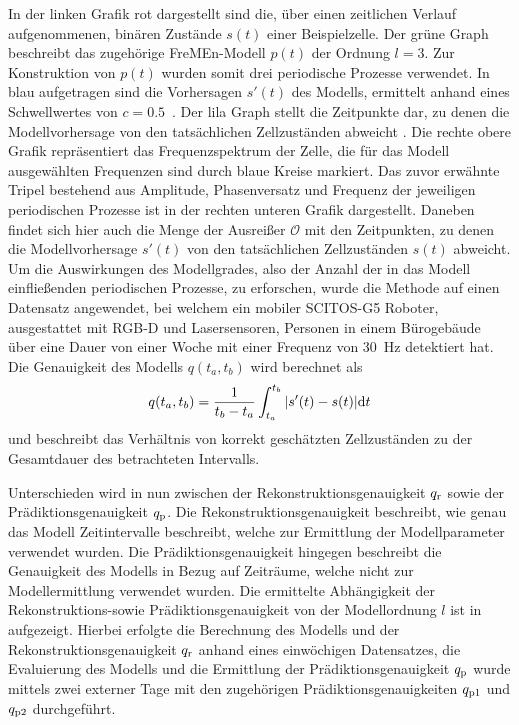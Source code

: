 In der linken Grafik rot dargestellt sind die, über einen zeitlichen Verlauf aufgenommenen, binären Zustände $s(t)$ einer Beispielzelle. Der grüne Graph beschreibt das zugehörige FreMEn-Modell $p(t)$ der Ordnung $l = 3$. Zur Konstruktion von $p(t)$ wurden somit drei periodische Prozesse verwendet. In blau aufgetragen sind die Vorhersagen $s'(t)$ des Modells, ermittelt anhand eines Schwellwertes von $c = 0.5$ \,. Der lila Graph stellt die Zeitpunkte dar, zu denen die Modellvorhersage von den tatsächlichen Zellzuständen abweicht \cite{Krajnik.2014}. Die rechte obere Grafik repräsentiert das Frequenzspektrum der Zelle, die für das Modell ausgewählten Frequenzen sind durch blaue Kreise markiert. Das zuvor erwähnte Tripel bestehend aus Amplitude, Phasenversatz und Frequenz der jeweiligen periodischen Prozesse ist in der rechten unteren Grafik dargestellt. Daneben findet sich hier auch die Menge der Ausreißer $\mathcal{O}$ mit den Zeitpunkten, zu denen die Modellvorhersage $s'(t)$ von den tatsächlichen Zellzuständen $s(t)$ abweicht.  Um die Auswirkungen des Modellgrades, also der Anzahl der in das Modell einfließenden periodischen Prozesse, zu erforschen, wurde die Methode auf einen Datensatz angewendet, bei welchem ein mobiler SCITOS-G5 Roboter, ausgestattet mit RGB-D und Lasersensoren, Personen in einem Bürogebäude über eine Dauer von einer Woche mit einer Frequenz von \SI{30}{\hertz} detektiert hat. \\
Die Genauigkeit des Modells $q(t_a,t_b)$ wird berechnet als
\begin{equation}
	q(t_a,t_b) = \frac{1}{t_b - t_a} \int_{t_a}^{t_b} |s'(t) - s(t)| {\mathrm{d}}t
	\label{eq:Modellgenauigkeit}
\end{equation}
und beschreibt das Verhältnis von korrekt geschätzten Zellzuständen zu der Gesamtdauer des betrachteten Intervalls.

Unterschieden wird in \cite{Krajnik.2014} nun zwischen der Rekonstruktionsgenauigkeit $q_{\mathrm{r}}$ sowie der Prädiktionsgenauigkeit $q_{\mathrm{p}}$. Die Rekonstruktionsgenauigkeit beschreibt, wie genau das Modell Zeitintervalle beschreibt, welche zur Ermittlung der Modellparameter verwendet wurden. Die Prädiktionsgenauigkeit hingegen beschreibt die Genauigkeit des Modells in Bezug auf Zeiträume, welche nicht zur Modellermittlung verwendet wurden. Die ermittelte Abhängigkeit der Rekonstruktions-sowie Prädiktionsgenauigkeit von der Modellordnung $l$ ist in  aufgezeigt. Hierbei erfolgte die Berechnung des Modells und der Rekonstruktionsgenauigkeit $q_{\mathrm{r}}$ anhand eines einwöchigen Datensatzes, die Evaluierung des Modells und die Ermittlung der Prädiktionsgenauigkeit $q_{\mathrm{p}}$ wurde mittels zwei externer Tage mit den zugehörigen Prädiktionsgenauigkeiten $q_{\mathrm{p1}}$ und $q_{\mathrm{p2}}$ durchgeführt.  \\

